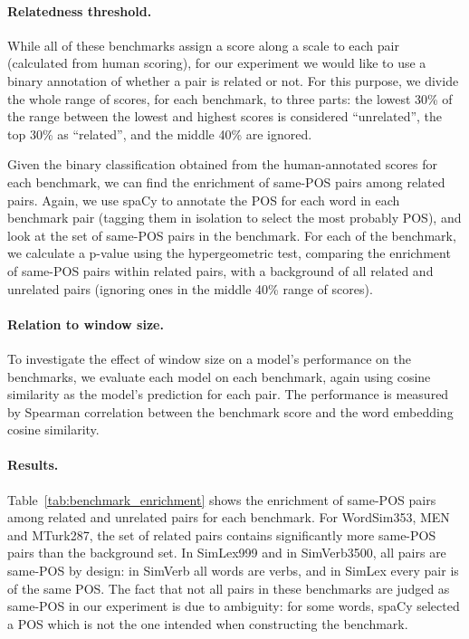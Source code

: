 \documentclass[11pt,a4paper]{article}
\begin{document}
    \paragraph{Relatedness threshold.}
    
    While all of these benchmarks assign a score along a scale to each pair
    (calculated from human scoring), for our experiment we would like to use
    a binary annotation of whether a pair is related or not.
    For this purpose, we divide the whole range of scores,
    for each benchmark, to three parts:
    the lowest 30\% of the range between the lowest and highest scores
    is considered ``unrelated'', the top 30\% as ``related'',
    and the middle 40\% are ignored.
    
    Given the binary classification obtained from the human-annotated scores
    for each benchmark, we can find the enrichment of same-POS pairs among
    related pairs.
    Again, we use spaCy to annotate the POS for each word in each benchmark
    pair (tagging them in isolation to select the most probably POS),
    and look at the set of same-POS pairs in the benchmark.
    For each of the benchmark, we calculate a p-value using the hypergeometric
    test, comparing the enrichment of same-POS pairs within related pairs,
    with a background of all related and unrelated pairs (ignoring ones in
    the middle 40\% range of scores).
    
    \paragraph{Relation to window size.}
    
    To investigate the effect of window size on a model's performance on the benchmarks,
    we evaluate each model on each benchmark, again using cosine similarity
    as the model's prediction for each pair.
    The performance is measured by Spearman correlation between the benchmark score
    and the word embedding cosine similarity.
    
    \paragraph{Results.}
    
    Table~\ref{tab:benchmark_enrichment} shows the enrichment of same-POS pairs
    among related and unrelated pairs for each benchmark.
    For WordSim353, MEN and MTurk287, the set of related pairs
    contains significantly more same-POS pairs than the background set.
    In SimLex999 and in SimVerb3500, all pairs are same-POS by design:
    in SimVerb all words are verbs, and in SimLex every pair is of the same POS.
    The fact that not all pairs in these benchmarks are judged as same-POS
    in our experiment is due to ambiguity: for some words, spaCy selected a POS
    which is not the one intended when constructing the benchmark.
    
\end{document}
